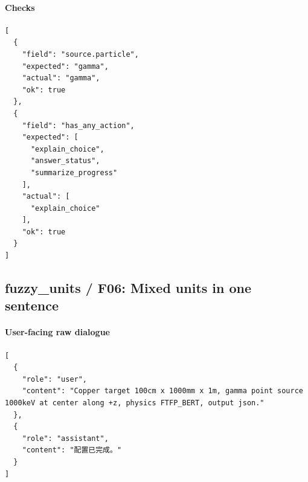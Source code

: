 \documentclass[11pt]{ctexart}
\begin{document}
\paragraph{Checks}
\begin{lstlisting}
[
  {
    "field": "source.particle",
    "expected": "gamma",
    "actual": "gamma",
    "ok": true
  },
  {
    "field": "has_any_action",
    "expected": [
      "explain_choice",
      "answer_status",
      "summarize_progress"
    ],
    "actual": [
      "explain_choice"
    ],
    "ok": true
  }
]
\end{lstlisting}
\subsection{fuzzy\_units / F06: Mixed units in one sentence}
\paragraph{User-facing raw dialogue}
\begin{lstlisting}
[
  {
    "role": "user",
    "content": "Copper target 100cm x 1000mm x 1m, gamma point source 1000keV at center along +z, physics FTFP_BERT, output json."
  },
  {
    "role": "assistant",
    "content": "配置已完成。"
  }
]
\end{lstlisting}
\end{document}
